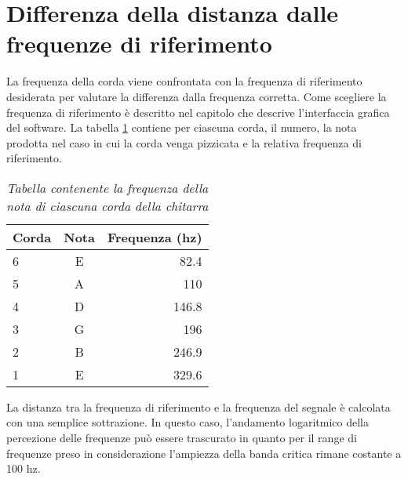 \chapter*{Differenza della distanza dalle frequenze di riferimento}\label{cap:distanza}

La frequenza della corda viene confrontata con la frequenza di riferimento desiderata per valutare la differenza dalla frequenza corretta.
Come scegliere la frequenza di riferimento è descritto nel capitolo che descrive l'interfaccia grafica del software.
La tabella \ref{tab:frequenze_riferimento} contiene per ciascuna corda, il numero, la nota prodotta nel caso in cui la corda venga pizzicata e la relativa frequenza di riferimento.

	\begin{table}[h]
	\center
	\begin{tabular}{|l|c|r|}
		\hline
		Corda	& 	Nota    & Frequenza (hz) \\
		\hline
		6	&	E	&	82.4     \\
		5	&	A	&	110      \\
		4	&	D	&	146.8    \\
		3	&	G	&	196      \\
		2	&	B	&	246.9    \\
		1	&	E	&	329.6    \\
		\hline
	\end{tabular}
	\caption{\textit{Tabella contenente la frequenza della nota di ciascuna corda della chitarra}}
	\label{tab:frequenze_riferimento}
	\end{table}

La distanza tra la frequenza di riferimento e la frequenza del segnale è calcolata con una semplice sottrazione.
In questo caso, l'andamento logaritmico della percezione delle frequenze può essere trascurato in quanto per il range di frequenze preso in considerazione l'ampiezza della banda critica rimane costante a 100 hz. 
